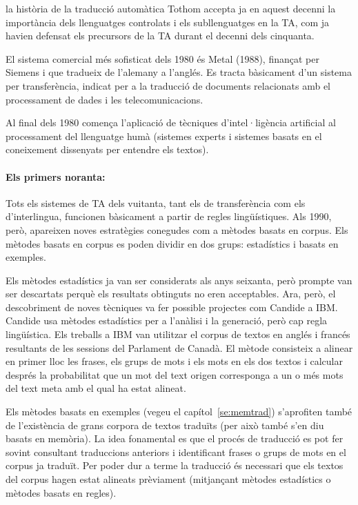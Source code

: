 \begin{persabermes}{la història de la traducció automàtica}
  Tothom accepta ja en aquest decenni la importància dels llenguatges
  controlats i els subllenguatges en la TA, com ja havien defensat els
  precursors de la TA durant el decenni dels cinquanta.

  El sistema comercial més sofisticat dels 1980 és Metal (1988),
  finançat per Siemens i que tradueix de l'alemany a l'anglés.  Es
  tracta bàsicament d'un sistema per transferència, indicat per a la
  traducció de documents relacionats amb el processament de dades i
  les telecomunicacions.

  Al final dels 1980 comença l'aplicació de tècniques d'intel·ligència
  artificial al processament del llenguatge humà (sistemes experts i
  sistemes basats en el coneixement dissenyats per entendre els
  textos).

  \paragraph{Els primers noranta:} Tots els sistemes de TA dels
  vuitanta, tant els de transferència com els d'interlingua, funcionen
  bàsicament a partir de regles lingüístiques. Als 1990, però,
  apareixen noves estratègies conegudes com a mètodes basats en
  corpus. Els mètodes basats en corpus es poden dividir en dos grups:
  estadístics i basats en exemples.

  Els mètodes estadístics ja van ser considerats als anys seixanta,
  però prompte van ser descartats perquè els resultats obtinguts no
  eren acceptables. Ara, però, el descobriment de noves tècniques va
  fer possible projectes com Candide a IBM. Candide usa mètodes
  estadístics per a l'anàlisi i la generació, però cap regla
  lingüística. Els treballs a IBM van utilitzar el corpus de textos en
  anglés i francés resultants de les sessions del Parlament de Canadà.
  El mètode consisteix a alinear en primer lloc les frases, els grups
  de mots i els mots en els dos textos i calcular després la
  probabilitat que un mot del text origen corresponga a un o més mots
  del text meta amb el qual ha estat alineat.

  Els mètodes basats en exemples (vegeu el capítol~\ref{se:memtrad})
  s'aprofiten també de l'existència de grans corpora de textos
  traduïts (per això també s'en diu basats en memòria). La idea
  fonamental es que el procés de traducció es pot fer sovint
  consultant traduccions anteriors i identificant frases o grups de
  mots en el corpus ja traduït. Per poder dur a terme la traducció és
  necessari que els textos del corpus hagen estat alineats prèviament
  (mitjançant mètodes estadístics o mètodes basats en regles).


\end{persabermes}
